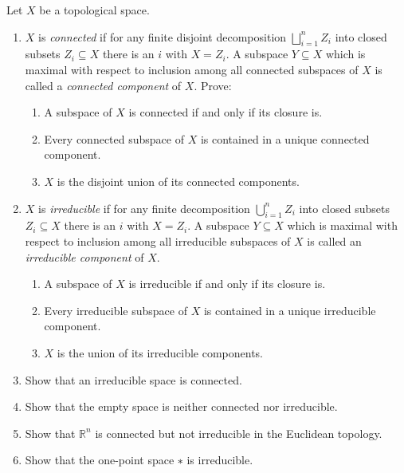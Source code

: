 \documentclass{exercises}
\begin{document}
\begin{exercise}
  Let $X$ be a topological space.
  \begin{enumerate}
    \item $X$ is \emph{connected} if for any finite disjoint decomposition $⨆_{i=1}^nZ_i$ into closed subsets $Z_i⊆X$ there is an $i$ with $X=Z_i$.
      A subspace $Y⊆X$ which is maximal with respect to inclusion among all connected subspaces of $X$ is called a \emph{connected component} of $X$.
      Prove:
      \begin{enumerate}
        \item A subspace of $X$ is connected if and only if its closure is.
        \item Every connected subspace of $X$ is contained in a unique connected component.
        \item $X$ is the disjoint union of its connected components.
      \end{enumerate}
    \item $X$ is \emph{irreducible} if for any finite decomposition $⋃_{i=1}^nZ_i$ into closed subsets $Z_i⊆X$ there is an $i$ with $X=Z_i$.
      A subspace $Y⊆X$ which is maximal with respect to inclusion among all irreducible subspaces of $X$ is called an \emph{irreducible component} of $X$.
      \begin{enumerate}
        \item A subspace of $X$ is irreducible if and only if its closure is.
        \item Every irreducible subspace of $X$ is contained in a unique irreducible component.
        \item $X$ is the union of its irreducible components.
      \end{enumerate}
    \item Show that an irreducible space is connected.
    \item Show that the empty space is neither connected nor irreducible.
    \item Show that $ℝ^n$ is connected but not irreducible in the Euclidean topology.
    \item Show that the one-point space $∗$ is irreducible.
  \end{enumerate}
\end{exercise}
\end{document}
